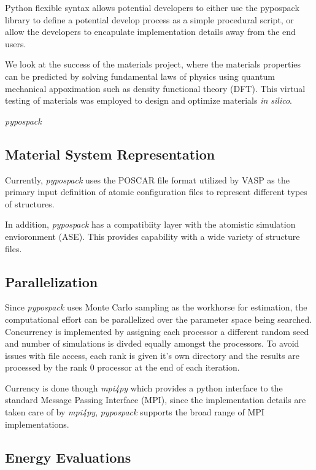 Python flexible syntax allows potential developers to either use the pypospack library to define a potential develop process as a simple procedural script, or allow the developers to encapulate implementation details away from the end users.

We look at the success of the materials project, where the materials properties can be predicted by solving fundamental laws of physics using quantum mechanical appoximation such as density functional theory (DFT).  This virtual testing of materials was employed to design and optimize materials \emph{in silico}.

\emph{pypospack}
\subsection{Material System Representation}

Currently, \emph{pypospack} uses the POSCAR file format utilized by VASP as the primary input definition of atomic configuration files to represent different types of structures.

In addition, \emph{pypospack} has a compatibiity layer with the atomistic simulation envioronment (ASE).  This provides capability with a wide variety of structure files.

\subsection{Parallelization}

Since \emph{pypospack} uses Monte Carlo sampling as the workhorse for estimation, the computational effort can be parallelized over the parameter space being searched.  Concurrency is implemented by assigning each processor a different random seed and number of simulations is divded equally amongst the processors.  To avoid issues with file access, each rank is given it's own directory and the results are processed by the rank $0$ processor at the end of each iteration.

Currency is done though \emph{mpi4py} which provides a python interface to the standard Message Passing Interface (MPI), since the implementation details are taken care of by \emph{mpi4py}, \emph{pypospack} supports the broad range of MPI implementations.

\subsection{Energy Evaluations}

